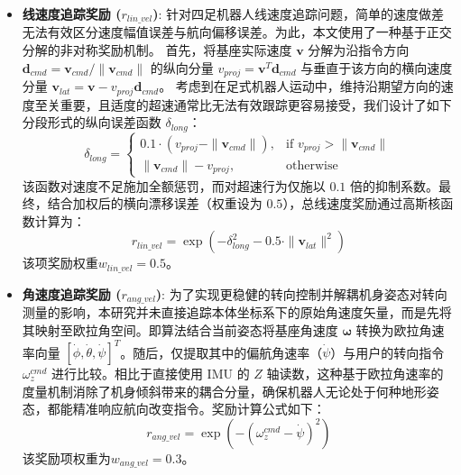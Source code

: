 \begin{itemize}
    \item \textbf{线速度追踪奖励 ($r_{lin\_vel}$)}:
          针对四足机器人线速度追踪问题，简单的速度做差无法有效区分速度幅值误差与航向偏移误差。为此，本文使用了一种基于正交分解的非对称奖励机制。
          首先，将基座实际速度 $\mathbf{v}$ 分解为沿指令方向 $\mathbf{d}_{cmd} = \mathbf{v}_{cmd} / \|\mathbf{v}_{cmd}\|$ 的纵向分量 $v_{proj} = \mathbf{v}^T \mathbf{d}_{cmd}$ 与垂直于该方向的横向速度分量 $\mathbf{v}_{lat} = \mathbf{v} - v_{proj}\mathbf{d}_{cmd}$。
          考虑到在足式机器人运动中，维持沿期望方向的速度至关重要，且适度的超速通常比无法有效跟踪更容易接受，我们设计了如下分段形式的纵向误差函数 $\delta_{long}$：
          \begin{equation}
              \delta_{long} = \begin{cases}
                  0.1 \cdot (v_{proj} - \|\mathbf{v}_{cmd}\|), & \text{if } v_{proj} > \|\mathbf{v}_{cmd}\| \\
                  \|\mathbf{v}_{cmd}\| - v_{proj},             & \text{otherwise}
              \end{cases}
          \end{equation}
          该函数对速度不足施加全额惩罚，而对超速行为仅施以 $0.1$ 倍的抑制系数。最终，结合加权后的横向漂移误差（权重设为 $0.5$），总线速度奖励通过高斯核函数计算为：
          \begin{equation}
              r_{lin\_vel} = \exp \left( -\delta_{long}^2 - 0.5 \cdot \|\mathbf{v}_{lat}\|^2 \right)
          \end{equation}
          该项奖励权重$w_{lin\_vel}=0.5$。

    \item \textbf{角速度追踪奖励 ($r_{ang\_vel}$)}:
          为了实现更稳健的转向控制并解耦机身姿态对转向测量的影响，本研究并未直接追踪本体坐标系下的原始角速度矢量，而是先将其映射至欧拉角空间。即算法结合当前姿态将基座角速度 $\boldsymbol{\omega}$ 转换为欧拉角速率向量 $[\dot{\phi}, \dot{\theta}, \dot{\psi}]^T$。随后，仅提取其中的偏航角速率（$\dot{\psi}$）与用户的转向指令 $\omega_{z}^{cmd}$ 进行比较。相比于直接使用 IMU 的 $Z$ 轴读数，这种基于欧拉角速率的度量机制消除了机身倾斜带来的耦合分量，确保机器人无论处于何种地形姿态，都能精准响应航向改变指令。奖励计算公式如下：
          \begin{equation}
              r_{ang\_vel} = \exp \left( -(\omega_{z}^{cmd} - \dot{\psi})^2 \right)
          \end{equation}
          该奖励项权重为$w_{ang\_vel}=0.3$。


\end{itemize}
